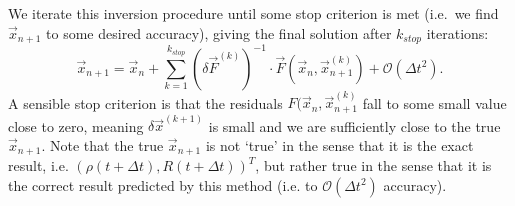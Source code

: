 \documentclass[11pt,twoside]{report}
\begin{document}
We iterate this inversion procedure until some stop criterion is met (i.e.\ we find $\vec{x}_{n+1}$ to some desired accuracy), giving the final solution after $k_{stop}$ iterations:
\begin{equation}
  \vec{x}_{n+1} =
  \vec{x}_n + \sum_{k=1}^{k_{stop}}
  (\delta \vec{F}^{(k)})^{-1} \cdot \vec{F}(\vec{x}_n, \vec{x}_{n+1}^{(k)})
  + \mathcal{O}(\Delta t^2).
\end{equation}
A sensible stop criterion is that the residuals $F(\vec{x}_n, \vec{x}_{n+1}^{(k)}$ fall to some small value close to zero, meaning $\delta\vec{x}^{(k+1)}$ is small and we are sufficiently close to the true $\vec{x}_{n+1}$.
Note that the true $\vec{x}_{n+1}$ is not `true' in the sense that it is the exact result, i.e. $(\rho(t + \Delta t), R(t + \Delta t))^T$, but rather true in the sense that it is the correct result predicted by this method (i.e. to $\mathcal{O}(\Delta t^2)$ accuracy).
\end{document}
